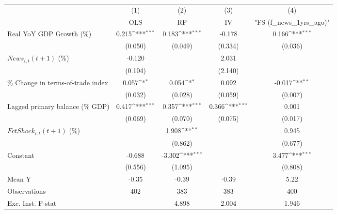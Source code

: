{
\def\sym#1{\ifmmode^{#1}\else\(^{#1}\)\fi}
\begin{tabular}{l*{4}{c}}
\toprule
                    &\multicolumn{1}{c}{(1)}&\multicolumn{1}{c}{(2)}&\multicolumn{1}{c}{(3)}&\multicolumn{1}{c}{(4)}\\
                    &\multicolumn{1}{c}{OLS}&\multicolumn{1}{c}{RF}&\multicolumn{1}{c}{IV}&\multicolumn{1}{c}{ "FS (f_news_1yrs_ago)" }\\
\midrule
Real YoY GDP Growth (\%)&       0.215\sym{***}&       0.183\sym{***}&      -0.178         &       0.166\sym{***}\\
                    &     (0.050)         &     (0.049)         &     (0.334)         &     (0.036)         \\
\addlinespace
$ News_{i,t}(t+1)$ (\%)&      -0.120         &                     &       2.031         &                     \\
                    &     (0.104)         &                     &     (2.140)         &                     \\
\addlinespace
\% Change in terms-of-trade index&       0.057\sym{*}  &       0.054\sym{*}  &       0.092         &      -0.017\sym{**} \\
                    &     (0.032)         &     (0.028)         &     (0.059)         &     (0.007)         \\
\addlinespace
Lagged primary balance (\% GDP)&       0.417\sym{***}&       0.357\sym{***}&       0.366\sym{***}&       0.001         \\
                    &     (0.069)         &     (0.070)         &     (0.075)         &     (0.017)         \\
\addlinespace
$ FctShock_{i,t}(t+1)$ (\%)&                     &       1.908\sym{**} &                     &       0.945         \\
                    &                     &     (0.862)         &                     &     (0.677)         \\
\addlinespace
Constant            &      -0.688         &      -3.302\sym{***}&                     &       3.477\sym{***}\\
                    &     (0.556)         &     (1.095)         &                     &     (0.808)         \\
\midrule
Mean Y              &       -0.35         &       -0.39         &       -0.39         &        5.22         \\
Observations        &         402         &         383         &         383         &         400         \\
Exc. Inst. F-stat   &                     &       4.898         &       2.004         &       1.946         \\
\bottomrule
\end{tabular}
}
